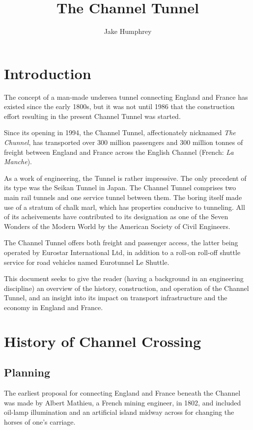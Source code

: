 \documentclass[12pt]{article} %
\title{The Channel Tunnel}
\author{Jake Humphrey}
\date{} %
\begin{document}
\maketitle

\section{Introduction}
\label{sec:intro}

The concept of a man-made undersea tunnel connecting England and France has existed since the early 1800s, but it was not until 1986 that the construction effort resulting in the present Channel Tunnel was started.

Since its opening in 1994, the Channel Tunnel, affectionately nicknamed \emph{The Chunnel}, has transported over 300 million passengers and 300 million tonnes of freight between England and France across the English Channel (French: \emph{La Manche}).

As a work of engineering, the Tunnel is rather impressive. The only precedent of its type was the Seikan Tunnel in Japan. The Channel Tunnel comprises two main rail tunnels and one service tunnel between them. The boring itself made use of a stratum of chalk marl, which has properties conducive to tunneling. All of its acheivements have contributed to its designation as one of the Seven Wonders of the Modern World by the American Society of Civil Engineers.

The Channel Tunnel offers both freight and passenger access, the latter being operated by Eurostar International Ltd, in addition to a roll-on roll-off shuttle service for road vehicles named Eurotunnel Le Shuttle.

This document seeks to give the reader (having a background in an engineering discipline) an overview of the history, construction, and operation of the Channel Tunnel, and an insight into its impact on transport infrastructure and the economy in England and France.

\section{History of Channel Crossing}
\subsection{Planning}

The earliest proposal for connecting England and France beneath the Channel was made by  Albert Mathieu, a French mining engineer, in 1802, and included oil-lamp illumination and an artificial island midway across for changing the horses of one's carriage.\cite{eurotunnel-build}
\end{document}
